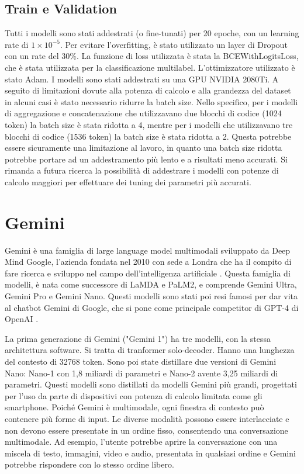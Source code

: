 \documentclass[../../Thesis.tex]{subfiles}
\begin{document}
\subsection{Train e Validation}
Tutti i modelli sono stati addestrati (o fine-tunati) per 20 epoche, con un learning rate di $1 \times 10^{-5}$. Per evitare l'overfitting, è stato utilizzato un layer di Dropout con un rate del 30\%. La funzione di loss utilizzata è stata la BCEWithLogitsLoss, che è stata utilizzata per la classificazione multilabel. L'ottimizzatore utilizzato è stato Adam. I modelli sono stati addestrati su una GPU NVIDIA 2080Ti. A seguito di limitazioni dovute alla potenza di calcolo e alla grandezza del dataset in alcuni casi è stato necessario ridurre la batch size. Nello specifico, per i modelli di aggregazione e concatenazione che utilizzavano due blocchi di codice (1024 token) la batch size è stata ridotta a 4, mentre per i modelli che utilizzavano tre blocchi di codice (1536 token) la batch size è stata ridotta a 2. Questa potrebbe essere sicuramente una limitazione al lavoro, in quanto una batch size ridotta potrebbe portare ad un addestramento più lento e a risultati meno accurati. Si rimanda a futura ricerca la possibilità di addestrare i modelli con potenze di calcolo maggiori per effettuare dei tuning dei parametri più accurati. 

\section{Gemini}
Gemini è una famiglia di large language model multimodali sviluppato da Deep Mind Google, l'azienda fondata nel 2010 con sede a Londra che ha il compito di fare ricerca e sviluppo nel campo dell'intelligenza artificiale \cite{DeepMind}. 
Questa famiglia di modelli, è nata come successore di LaMDA e PaLM2, e comprende Gemini Ultra, Gemini Pro e Gemini Nano. Questi modelli sono stati poi resi famosi per dar vita al chatbot Gemini di Google, che si pone come principale competitor di GPT-4 di OpenAI \cite{Gemini}. 

La prima generazione di Gemini ("Gemini 1") ha tre modelli, con la stessa architettura software. Si tratta di tranformer solo-decoder. Hanno una lunghezza del contesto di 32768 token. Sono poi state distillare due versioni di Gemini Nano: Nano-1 con 1,8 miliardi di parametri e Nano-2 avente 3,25 miliardi di parametri. Questi modelli sono distillati da modelli Gemini più grandi, progettati per l'uso da parte di dispositivi con potenza di calcolo limitata come gli smartphone. Poiché Gemini è multimodale, ogni finestra di contesto può contenere più forme di input. Le diverse modalità possono essere interlacciate e non devono essere presentate in un ordine fisso, consentendo una conversazione multimodale. Ad esempio, l'utente potrebbe aprire la conversazione con una miscela di testo, immagini, video e audio, presentata in qualsiasi ordine e Gemini potrebbe rispondere con lo stesso ordine libero.
\end{document}
